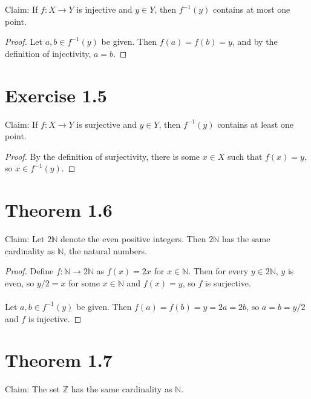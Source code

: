 \documentclass{article}
\begin{document}
Claim: If $f: X \rightarrow Y$ is injective and $y \in Y$, then $f^{-1}(y)$ contains at most 
one point.

\begin{proof} 
    Let $a, b \in f^{-1}(y)$ be given.  Then $f(a) = f(b) = y$, and by the definition 
    of injectivity, $a = b$.  
\end{proof}

\section*{Exercise 1.5}

Claim: If $f: X \rightarrow Y$ is surjective and $y \in Y$, then $f^{-1}(y)$ contains 
at least one point.

\begin{proof} 
    By the definition of surjectivity, there is some $x \in X$ such that $f(x) = y$, 
    so $x \in f^{-1}(y)$.
\end{proof}

\section*{Theorem 1.6}

Claim: Let $2 \mathbb{N}$ denote the even positive integers.  Then $2 \mathbb{N}$ 
has the same cardinality as $\mathbb{N}$, the natural numbers.

\begin{proof}
    Define $f:\mathbb{N} \rightarrow 2 \mathbb{N}$ as $f(x) = 2x$ for $x \in \mathbb{N}$.  
    Then for every $y \in 2 \mathbb{N}$, $y$ is even, so $y/2 = x$ for some $x \in \mathbb{N}$ 
    and $f(x) = y$, so $f$ is surjective. \\ 
    \\ 
    Let $a, b \in f^{-1}(y)$ be given.  Then $f(a) = f(b) = y = 2a = 2b$, so $a = b = y/2$ 
    and $f$ is injective.
\end{proof}

\section*{Theorem 1.7}

Claim: The set $\mathbb{Z}$ has the same cardinality as $\mathbb{N}$.
\end{document}
